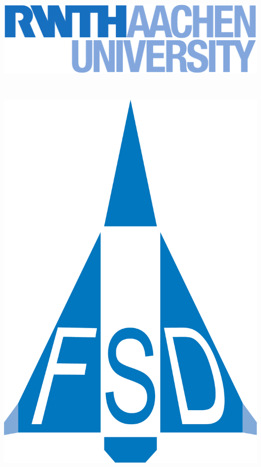 %
%
\begin{titlepage}
\begin{center}
  \begin{minipage}[t]{0.43\textwidth}
		\vspace*{0pt}
    \includegraphics[width=\textwidth]{pics/rwth_logo_blau}
  \end{minipage}
  \begin{minipage}[t]{0.45\textwidth}
    \vspace*{0pt}
		\centering {} \\
  \vspace{0.4cm}
  \centering {}
  \end{minipage}
  \begin{minipage}[t]{0.085\textwidth}
    \vspace*{0pt}
    \flushright \includegraphics[width=\textwidth]{pics/fsd_logo}
  \end{minipage}
  

\end{center}
\end{titlepage}
